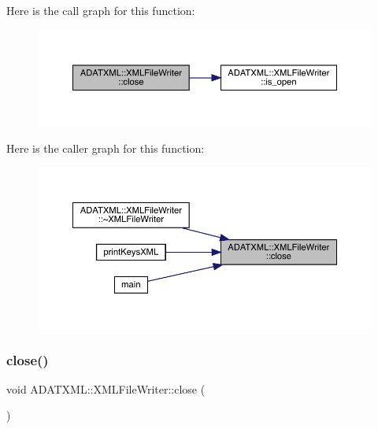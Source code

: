 Here is the call graph for this function\+:\nopagebreak
\begin{figure}[H]
\begin{center}
\leavevmode
\includegraphics[width=350pt]{d6/ddb/classADATXML_1_1XMLFileWriter_a1a51ceb51781ac6f3a476dcf99a75017_cgraph}
\end{center}
\end{figure}
Here is the caller graph for this function\+:
\nopagebreak
\begin{figure}[H]
\begin{center}
\leavevmode
\includegraphics[width=350pt]{d6/ddb/classADATXML_1_1XMLFileWriter_a1a51ceb51781ac6f3a476dcf99a75017_icgraph}
\end{center}
\end{figure}
\mbox{\label{classADATXML_1_1XMLFileWriter_a1a51ceb51781ac6f3a476dcf99a75017}} 
\subsubsection{\texorpdfstring{close()}{close()}\hspace{0.1cm}{\footnotesize\ttfamily [2/2]}}
{\footnotesize\ttfamily void A\+D\+A\+T\+X\+M\+L\+::\+X\+M\+L\+File\+Writer\+::close (\begin{DoxyParamCaption}{ }\end{DoxyParamCaption})}



